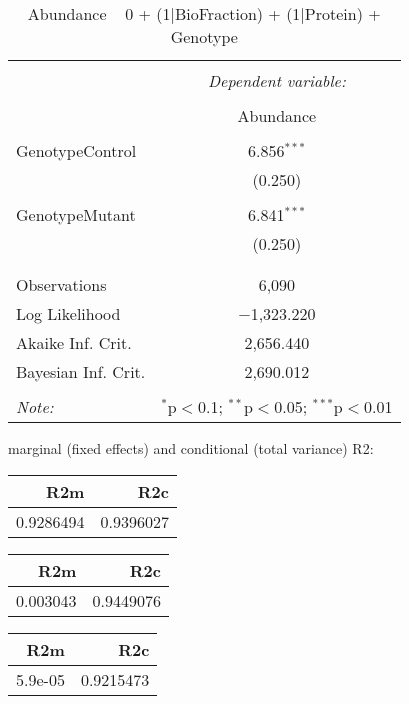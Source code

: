 \documentclass[11pt]{report}
\begin{document}
\begin{table}[!htbp] \centering 
  \caption{Abundance ~ 0 + (1|BioFraction) + (1|Protein) + Genotype} 
  \label{} 
\begin{tabular}{@{\extracolsep{5pt}}lc} 
\\[-1.8ex]\hline 
\hline \\[-1.8ex] 
 & \multicolumn{1}{c}{\textit{Dependent variable:}} \\ 
\cline{2-2} 
\\[-1.8ex] & Abundance \\ 
\hline \\[-1.8ex] 
 GenotypeControl & 6.856$^{***}$ \\ 
  & (0.250) \\ 
  & \\ 
 GenotypeMutant & 6.841$^{***}$ \\ 
  & (0.250) \\ 
  & \\ 
\hline \\[-1.8ex] 
Observations & 6,090 \\ 
Log Likelihood & $-$1,323.220 \\ 
Akaike Inf. Crit. & 2,656.440 \\ 
Bayesian Inf. Crit. & 2,690.012 \\ 
\hline 
\hline \\[-1.8ex] 
\textit{Note:}  & \multicolumn{1}{r}{$^{*}$p$<$0.1; $^{**}$p$<$0.05; $^{***}$p$<$0.01} \\ 
\end{tabular} 
\end{table} 
marginal (fixed effects) and conditional (total variance) R2:

\begin{tabular}{r|r}
\hline
R2m & R2c\\
\hline
0.9286494 & 0.9396027\\
\hline
\end{tabular}

\begin{tabular}{r|r}
\hline
R2m & R2c\\
\hline
0.003043 & 0.9449076\\
\hline
\end{tabular}

\begin{tabular}{r|r}
\hline
R2m & R2c\\
\hline
5.9e-05 & 0.9215473\\
\hline
\end{tabular}
\end{document}
